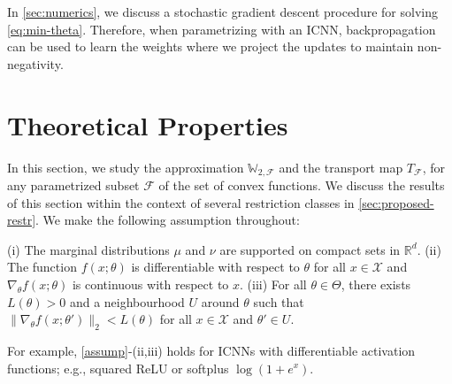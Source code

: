 \documentclass[10pt]{article}
\newcommand{\real}{\mathbb{R}}
\newcommand{\W}{\mathds{W}}
\newcommand{\calF}{\mathcal{F}}
\numberwithin{equation}{section}
\begin{document}
In \autoref{sec:numerics}, we discuss a stochastic gradient descent procedure for solving \eqref{eq:min-theta}. Therefore, when parametrizing with an ICNN, backpropagation can be used to learn the weights where we project the updates to maintain non-negativity. 

\section{Theoretical Properties}\label{sec:main-results}
In this section, we study the approximation $\W_{2,\calF}$ and the transport map $T_{\calF}$, for any parametrized subset $\calF$ of the set of convex functions. We discuss the results of this section within the context of several restriction classes in \autoref{sec:proposed-restr}. 
We make the following assumption throughout: 
\begin{assumption}\label{assump}
(i) The marginal distributions $\mu$ and $\nu$ are supported on compact sets in $\real^d$. 
(ii) The function $f(x;\theta)$ is differentiable with respect to $\theta$ for all $x\in \mathcal{X}$ and $\nabla_\theta f(x;\theta)$ is continuous with respect to $x$. 
(iii) For all $\theta \in \Theta$, there exists $L(\theta)>0$ and a neighbourhood $U$ around $\theta$ such that $\|\nabla_\theta f(x;\theta')\|_2<L(\theta)$ for all $x\in \mathcal{X}$ and $\theta' \in U$. 
\end{assumption}
For example, 
\autoref{assump}-(ii,iii) holds for ICNNs with differentiable activation functions; e.g., squared ReLU or softplus $\log(1+e^x)$. 
\end{document}

